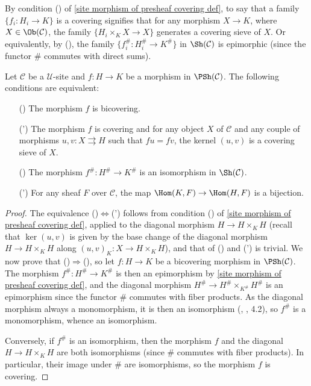 By condition () of \cref{site morphism of presheaf covering def}, to say that a family $\{f_i:H_i\to K\}$ is a covering signifies that for any morphism $X\to K$, where $X\in\Ob(\mathcal{C})$, the family $\{H_i\times_KX\to X\}$ generates a covering sieve of $X$. Or equivalently, by (), the family $\{f_i^\#:H_i^\#\to K^\#\}$ in $\Sh(\mathcal{C})$ is epimorphic (since the functor $\#$ commutes with direct sums).
\begin{proposition}\label{site morphism of presheaf bicovering iff}
Let $\mathcal{C}$ be a $\mathscr{U}$-site and $f:H\to K$ be a morphism in $\PSh(\mathcal{C})$. The following conditions are equivalent:
\begin{enumerate}
\item[(\rmnum{1})] The morphism $f$ is bicovering.
\item[(\rmnum{1}')] The morphism $f$ is covering and for any object $X$ of $\mathcal{C}$ and any couple of morphisms $u,v:X\rightrightarrows H$ such that $fu=fv$, the kernel $(u,v)$ is a covering sieve of $X$.
\item[(\rmnum{2})] The morphism $f^\#:H^\#\to K^\#$ is an isomorphism in $\Sh(\mathcal{C})$.
\item[(\rmnum{2}')] For any sheaf $F$ over $\mathcal{C}$, the map $\Hom(K,F)\to \Hom(H,F)$ is a bijection.
\end{enumerate}
\end{proposition}
\begin{proof}
The equivalence ()$\Leftrightarrow$(') follows from condition () of \cref{site morphism of presheaf covering def}, applied to the diagonal morphism $H\to H\times_KH$ (recall that $\ker(u,v)$ is given by the base change of the diagonal morphism $H\to H\times_KH$ along $(u,v)_K:X\to H\times_KH$), and that of () and (') is trivial. We now prove that ()$\Rightarrow$(), so let $f:H\to K$ be a bicovering morphism in $\PSh(\mathcal{C})$. The morphism $f^\#:H^\#\to K^\#$ is then an epimorphism by \cref{site morphism of presheaf covering def}, and the diagonal morphism $H^\#\to H^\#\times_{K^\#}H^\#$ is an epimorphism since the functor $\#$ commutes with fiber products. As the diagonal morphism always a monomorphism, it is then an isomorphism (\cite{SGA4-1}, , 4.2), so $f^\#$ is a monomorphism, whence an isomorphism.\par
Conversely, if $f^\#$ is an isomorphism, then the morphism $f$ and the diagonal $H\to H\times_KH$ are both isomorphisms (since $\#$ commutes with fiber products). In particular, their image under $\#$ are isomorphisms, so the morphism $f$ is covering.
\end{proof}
